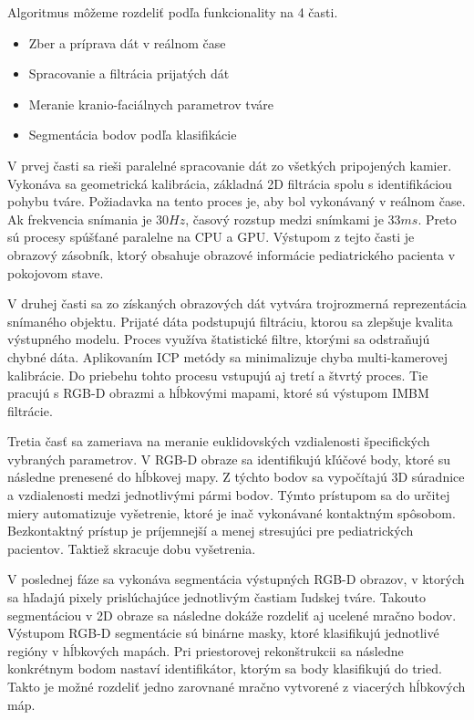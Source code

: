 \noindent Algoritmus môžeme rozdeliť podľa funkcionality na 4 časti. 

\begin{itemize}
	\item Zber a príprava dát v reálnom čase
	\item Spracovanie a filtrácia prijatých dát
	\item Meranie kranio-faciálnych parametrov tváre 
	\item Segmentácia bodov podľa klasifikácie 
\end{itemize}

V prvej časti sa rieši paralelné spracovanie dát zo všetkých pripojených kamier. Vykonáva sa geometrická kalibrácia, základná 2D filtrácia spolu s identifikáciou pohybu tváre. Požiadavka na tento proces je, aby bol vykonávaný v reálnom čase. Ak frekvencia snímania je $30Hz$, časový rozstup medzi snímkami je $33ms$. Preto sú procesy spúšťané paralelne na CPU a GPU. Výstupom z tejto časti je obrazový zásobník, ktorý obsahuje obrazové informácie pediatrického pacienta v pokojovom stave. \newline

V druhej časti sa zo získaných obrazových dát vytvára trojrozmerná reprezentácia snímaného objektu. Prijaté dáta podstupujú filtráciu, ktorou sa zlepšuje kvalita výstupného modelu. Proces využíva štatistické filtre, ktorými sa odstraňujú chybné dáta. Aplikovaním ICP metódy sa minimalizuje chyba multi-kamerovej kalibrácie. Do priebehu tohto procesu vstupujú aj tretí a štvrtý proces. Tie pracujú s RGB-D obrazmi a hĺbkovými mapami, ktoré sú výstupom IMBM filtrácie. \newline

Tretia časť sa zameriava na meranie euklidovských vzdialenosti špecifických vybraných parametrov. V RGB-D obraze sa identifikujú kľúčové body, ktoré su následne prenesené do hĺbkovej mapy. Z týchto bodov sa vypočítajú 3D súradnice a vzdialenosti medzi jednotlivými pármi bodov. Týmto prístupom sa do určitej miery automatizuje vyšetrenie, ktoré je inač vykonávané kontaktným spôsobom. Bezkontaktný prístup je príjemnejší a menej stresujúci pre pediatrických pacientov. Taktiež skracuje dobu vyšetrenia.\newline 

V poslednej fáze sa vykonáva segmentácia výstupných RGB-D obrazov, v ktorých sa hľadajú pixely prislúchajúce jednotlivým častiam ľudskej tváre. Takouto segmentáciou v 2D obraze sa následne dokáže rozdeliť aj ucelené mračno bodov. Výstupom RGB-D segmentácie sú binárne masky, ktoré klasifikujú jednotlivé regióny v hĺbkových mapách. Pri priestorovej rekonštrukcii sa následne konkrétnym bodom nastaví identifikátor, ktorým sa body klasifikujú do tried. Takto je možné rozdeliť jedno zarovnané mračno vytvorené z viacerých hĺbkových máp. \newline

